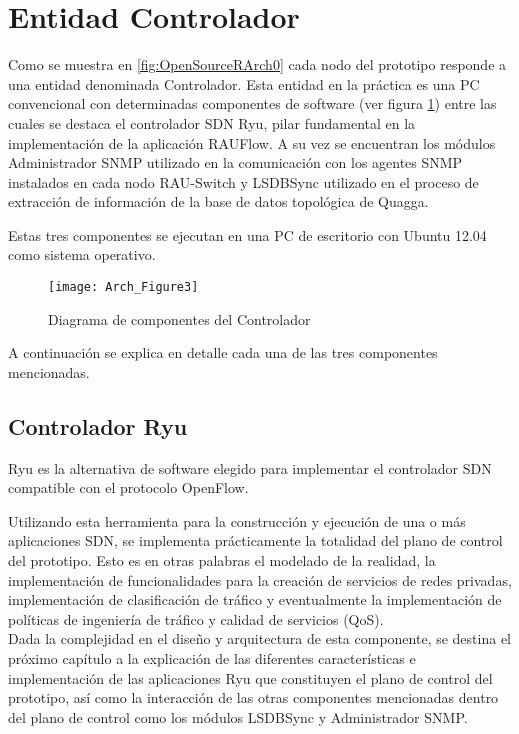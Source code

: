 \section{Entidad Controlador}
Como se muestra en \ref{fig:OpenSourceRArch0} cada nodo del prototipo responde a una entidad denominada Controlador. Esta entidad en la pr\'actica es una PC convencional con determinadas componentes de software (ver figura \ref{fig:OpenSourceRArch3}) entre las cuales se destaca el controlador SDN Ryu, pilar fundamental en la implementaci\'on de la aplicaci\'on RAUFlow. A su vez se encuentran los módulos Administrador SNMP utilizado en la comunicaci\'on con los agentes SNMP instalados en cada nodo RAU-Switch y LSDBSync utilizado en el proceso de extracci\'on de informaci\'on de la base de datos topol\'ogica de Quagga. 

Estas tres componentes se ejecutan en una PC de escritorio con Ubuntu 12.04 como sistema operativo. \\

\begin{figure}[h] 
\centering    
\texttt{[image: Arch\_Figure3]}
\caption[Diagrama de componentes del Controlador]{Diagrama de componentes del Controlador}
\label{fig:OpenSourceRArch3}
\end{figure}

A continuación se explica en detalle cada una de las tres componentes mencionadas.

\subsection{Controlador Ryu}
Ryu es la alternativa de software elegido para implementar el controlador SDN compatible con el protocolo OpenFlow. 

Utilizando esta herramienta para la construcci\'on y ejecuci\'on de una o m\'as aplicaciones SDN, se implementa prácticamente la totalidad del plano de control del prototipo. Esto es en otras palabras el modelado de la realidad, la implementaci\'on de funcionalidades para la creaci\'on de servicios de redes privadas, implementaci\'on de clasificaci\'on de tr\'afico y eventualmente la implementaci\'on de pol\'iticas de ingeniería de tr\'afico y calidad de servicios (QoS).\\ 

Dada la complejidad en el diseño y arquitectura de esta componente, se destina el próximo cap\'itulo a la explicaci\'on de las diferentes características e implementaci\'on de las aplicaciones Ryu que constituyen el plano de control del prototipo, as\'i como la interacci\'on de las otras componentes mencionadas dentro del plano de control como los m\'odulos LSDBSync y Administrador SNMP. 

